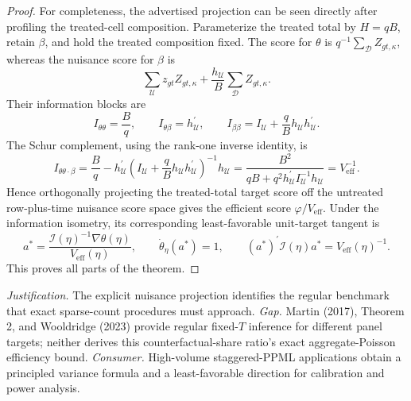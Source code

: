 \documentclass{article}
\begin{document}
\begin{proof}
For completeness, the advertised projection can be seen directly after
profiling the treated-cell composition.  Parameterize the treated total by
\(H=qB\), retain \(\beta\), and hold the treated composition fixed.  The
score for \(\theta\) is \(q^{-1}\sum_{\mathcal D}Z_{gt,\kappa}\), whereas
the nuisance score for \(\beta\) is
\[
 \sum_{\mathcal U}z_{gt}Z_{gt,\kappa}
   +\frac{h_{\mathcal U}}{B}\sum_{\mathcal D}Z_{gt,\kappa}.
\]
Their information blocks are
\[
 I_{\theta\theta}=\frac{B}{q},
 \qquad I_{\theta\beta}=h_{\mathcal U}^{\prime},
 \qquad I_{\beta\beta}=I_{\mathcal U}+\frac{q}{B}h_{\mathcal U}h_{\mathcal U}^{\prime}.
\]
The Schur complement, using the rank-one inverse identity, is
\[
 I_{\theta\theta\cdot\beta}
 =\frac{B}{q}
   -h_{\mathcal U}^{\prime}
      \left(I_{\mathcal U}+\frac{q}{B}h_{\mathcal U}h_{\mathcal U}^{\prime}\right)^{-1}
      h_{\mathcal U}
 =\frac{B^2}{qB+q^2h_{\mathcal U}^{\prime}I_{\mathcal U}^{-1}h_{\mathcal U}}
 =V_{\mathrm{eff}}^{-1}.
\]
Hence orthogonally projecting the treated-total target score off the
untreated row-plus-time nuisance score space gives the efficient score
\(\varphi/V_{\mathrm{eff}}\).  Under the information isometry, its
corresponding least-favorable unit-target tangent is
\[
 a^*=\frac{\mathcal I(\eta)^{-1}\nabla\theta(\eta)}{V_{\mathrm{eff}}(\eta)},
 \qquad
 \dot\theta_{\eta}(a^*)=1,
 \qquad
 (a^*)^{\prime}\mathcal I(\eta)a^*=V_{\mathrm{eff}}(\eta)^{-1}.
\]
This proves all parts of the theorem.
\end{proof}
\par\smallskip\noindent \textit{Justification.} The explicit nuisance projection identifies the regular benchmark that exact sparse-count procedures must approach. \textit{Gap.} Martin (2017), Theorem 2, and Wooldridge (2023) provide regular fixed-\(T\) inference for different panel targets; neither derives this counterfactual-share ratio's exact aggregate-Poisson efficiency bound. \textit{Consumer.} High-volume staggered-PPML applications obtain a principled variance formula and a least-favorable direction for calibration and power analysis.
\end{document}
